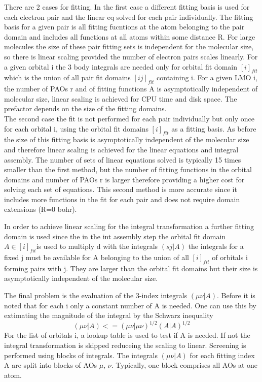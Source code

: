 \documentclass[10pt, draft]{article}
\begin{document}
	There are 2 cases for fitting.  In the first case a different fitting basis is used for each electron pair and the linear eq solved for each pair individually.  The fitting basis for a given pair is all fitting fucntions at the atom belonging to the pair domain and includes all functions at all atoms within some distance R.  For large molecules the size of these pair fitting sets is independent for the molecular size, so there is linear scaling provided the number of electron pairs scales linearly.  For a given orbital i the 3 body integrals are needed only for orbital fit domain $[i]_{fit}$ which is the union of all pair fit domains $[ij]_{fit}$ containing i.  For a given LMO i, the number of PAOs r and of fitting functions A is asymptotically independent of molecular size, linear scaling is achieved for CPU time and disk space.  The prefactor depends on the size of the fitting domains.  \\
	The second case the fit is not performed for each pair individually but only once for each orbital i, using the orbital fit domains $[i]_{fit}$ as a fitting basis.  As before the size of this fitting basis is asymptotically independent of the molecular size and therefore linear scaling is achieved for the linear equations and integral assembly.  The number of sets of linear equations solved is typically 15 times smaller than the first method, but the number of fitting functions in the orbital domains and number of PAOs r is larger therefore providing a higher cost for solving each set of equations.  This second method is more accurate since it includes more functions in the fit for each pair and does not require domain extensions (R=0 bohr).\linebreak[1]
	
	In order to achieve linear scaling for the integral transformation a further fitting domain is used since the in the int assembly step the orbital fit domain $A \in [i]_{fit} $is used to multiply d with the integrals $(sj|A)$ the integrals for a fixed j must be available for A belonging to the union of all $[i]_{fit}$ of orbitals i forming pairs with j.  They are larger than the orbital fit domains but their size is asymptotically independent of the molecular size.  \linebreak[1]
	
	The final problem is the evaluation of the 3-index integrals $(\mu\nu|A)$.  Before it is noted that for each i only a constant number of A is needed. One can use this by extimating the magnitude of the integral by the Schwarz inequality 
	\[(\mu\nu|A) <= (\mu\nu|\mu\nu)^{1/2}(A|A)^{1/2}\]
	For the list of orbitals i, a lookup table is used to test if A is needed. If not the integral transformation is skipped reduceing the scaling to linear. Screening is performed using blocks of integrals. The integrals $(\mu\nu |A)$ for each fitting index A are split into blocks of AOs $\mu$, $\nu$.  Typically, one block comprises all AOs at one atom.
\end{document}
